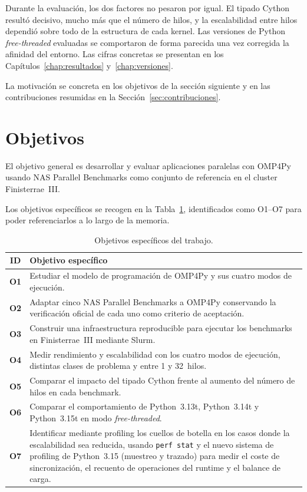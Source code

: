 Durante la evaluación, los dos factores no pesaron por igual. El tipado Cython
resultó decisivo, mucho más que el número de hilos, y la escalabilidad entre
hilos dependió sobre todo de la estructura de cada kernel. Las versiones de
Python \emph{free-threaded} evaluadas se comportaron de forma parecida una vez
corregida la afinidad del entorno. Las cifras concretas se presentan en los
Capítulos~\ref{chap:resultados} y~\ref{chap:versiones}.

La motivación se concreta en los objetivos de la sección siguiente y en las
contribuciones resumidas en la Sección~\ref{sec:contribuciones}.


\section{Objetivos}
\label{sec:objetivos}

El objetivo general es desarrollar y evaluar aplicaciones paralelas con OMP4Py
usando NAS Parallel Benchmarks como conjunto de referencia en el cluster
Finisterrae~III.

Los objetivos específicos se recogen en la Tabla~\ref{tab:objetivos},
identificados como O1--O7 para poder referenciarlos a lo largo de la memoria.

\begin{table}[htbp]
\centering
\small
\renewcommand{\arraystretch}{1.3}
\caption{Objetivos específicos del trabajo.}
\label{tab:objetivos}
\begin{tabular}{@{}c|p{}@{}}
\hline
\textbf{ID} & \textbf{Objetivo específico} \\
\hline
\textbf{O1} & Estudiar el modelo de programación de OMP4Py y sus cuatro modos de
      ejecución. \\
\hline
\textbf{O2} & Adaptar cinco NAS Parallel Benchmarks a OMP4Py conservando la verificación
      oficial de cada uno como criterio de aceptación. \\
\hline
\textbf{O3} & Construir una infraestructura reproducible para ejecutar los benchmarks en
      Finisterrae~III mediante Slurm. \\
\hline
\textbf{O4} & Medir rendimiento y escalabilidad con los cuatro modos de ejecución,
      distintas clases de problema y entre 1 y 32~hilos. \\
\hline
\textbf{O5} & Comparar el impacto del tipado Cython frente al aumento del número de hilos
      en cada benchmark. \\
\hline
\textbf{O6} & Comparar el comportamiento de Python~3.13t, Python~3.14t y Python~3.15t en
      modo \emph{free-threaded}. \\
\hline
\textbf{O7} & Identificar mediante profiling los cuellos de botella en los casos donde la
      escalabilidad sea reducida, usando \texttt{perf stat} y el nuevo sistema de
      profiling de Python~3.15 (muestreo y trazado) para medir el coste de
      sincronización, el recuento de operaciones del runtime y el balance de
      carga. \\
\hline
\end{tabular}
\end{table}


